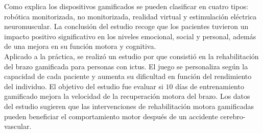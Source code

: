 Como explica \cite{perales5b} los dispositivos gamificados se pueden clasificar en cuatro tipos: robótica monitorizada, no monitorizada, realidad virtual y estimulación eléctrica neuromuscular.
La conclusión del estudio recoge que los pacientes tuvieron un impacto positivo significativo en los niveles emocional, social y personal, además de una mejora en su función motora y cognitiva.\\

Aplicado a la práctica, se realizó un estudio por \cite{perales5c} que consistió en la rehabilitación del brazo gamificada para personas con ictus.
El juego se personaliza según la capacidad de cada paciente y aumenta su dificultad en función del rendimiento del individuo.
El objetivo del estudio fue evaluar si $10$ días de entrenamiento gamificado mejora la velocidad de la recuperación motora del brazo.
Los datos del estudio sugieren que las intervenciones de rehabilitación motora gamificadas pueden beneficiar el comportamiento motor después de un accidente cerebro-vascular.\\

